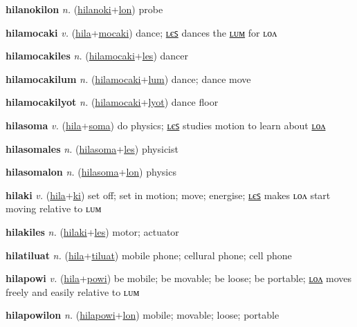 \textbf{\hypertarget{hilanokilon}{hilanokilon}} \textit{n.} (\hyperlink{hilanoki}{hilanoki}+\allowbreak \hyperlink{lon}{lon})
probe

\textbf{\hypertarget{hilamocaki}{hilamocaki}} \textit{v.} (\hyperlink{hila}{hila}+\allowbreak \hyperlink{mocaki}{mocaki})
dance; \hyperlink{hilamocakiles}{ʟєꜱ} dances the \hyperlink{hilamocakilum}{ʟᴜᴍ} for ʟᴏᴧ

\textbf{\hypertarget{hilamocakiles}{hilamocakiles}} \textit{n.} (\hyperlink{hilamocaki}{hilamocaki}+\allowbreak \hyperlink{les}{les})
dancer

\textbf{\hypertarget{hilamocakilum}{hilamocakilum}} \textit{n.} (\hyperlink{hilamocaki}{hilamocaki}+\allowbreak \hyperlink{lum}{lum})
dance; dance move

\textbf{\hypertarget{hilamocakilyot}{hilamocakilyot}} \textit{n.} (\hyperlink{hilamocaki}{hilamocaki}+\allowbreak \hyperlink{lyot}{lyot})
dance floor

\textbf{\hypertarget{hilasoma}{hilasoma}} \textit{v.} (\hyperlink{hila}{hila}+\allowbreak \hyperlink{soma}{soma})
do physics; \hyperlink{hilasomales}{ʟєꜱ} studies motion to learn about \hyperlink{hilasomalon}{ʟᴏᴧ}

\textbf{\hypertarget{hilasomales}{hilasomales}} \textit{n.} (\hyperlink{hilasoma}{hilasoma}+\allowbreak \hyperlink{les}{les})
physicist

\textbf{\hypertarget{hilasomalon}{hilasomalon}} \textit{n.} (\hyperlink{hilasoma}{hilasoma}+\allowbreak \hyperlink{lon}{lon})
physics

\textbf{\hypertarget{hilaki}{hilaki}} \textit{v.} (\hyperlink{hila}{hila}+\allowbreak \hyperlink{ki}{ki})
set off; set in motion; move; energise; \hyperlink{hilakiles}{ʟєꜱ} makes ʟᴏᴧ start moving relative to ʟᴜᴍ

\textbf{\hypertarget{hilakiles}{hilakiles}} \textit{n.} (\hyperlink{hilaki}{hilaki}+\allowbreak \hyperlink{les}{les})
motor; actuator

\textbf{\hypertarget{hilatiluat}{hilatiluat}} \textit{n.} (\hyperlink{hila}{hila}+\allowbreak \hyperlink{tiluat}{tiluat})
mobile phone; cellural phone; cell phone

\textbf{\hypertarget{hilapowi}{hilapowi}} \textit{v.} (\hyperlink{hila}{hila}+\allowbreak \hyperlink{powi}{powi})
be mobile; be movable; be loose; be portable; \hyperlink{hilapowilon}{ʟᴏᴧ} moves freely and easily relative to ʟᴜᴍ

\textbf{\hypertarget{hilapowilon}{hilapowilon}} \textit{n.} (\hyperlink{hilapowi}{hilapowi}+\allowbreak \hyperlink{lon}{lon})
mobile; movable; loose; portable

